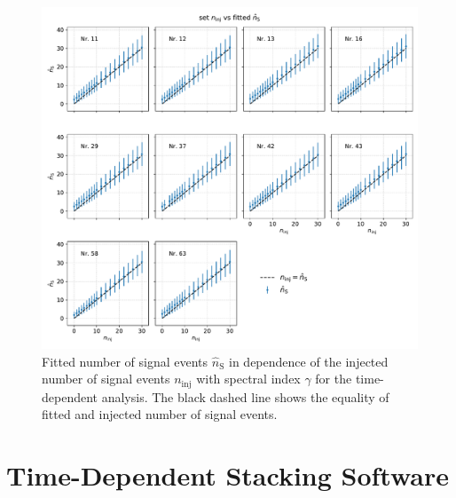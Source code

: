 \begin{figure}
    \centering
    \includegraphics[width=\linewidth]{Plots/appendix/ns_fit_time_dep.pdf}
    \caption{Fitted number of signal events $\hat{n}_{\text{S}}$ in dependence of the injected number of signal events $n_\text{inj}$ with spectral index $\gamma$ for the time-dependent analysis. The black dashed line shows the equality of fitted and injected number of signal events.}
    \label{fig:ns_fit_time_dep}
\end{figure}

\section{Time-Dependent Stacking Software}


